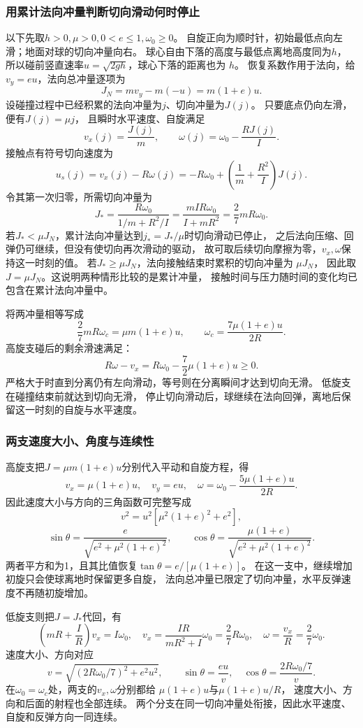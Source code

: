 \documentclass[UTF8,fontset=fandol,a4paper,11pt]{ctexart}
\begin{document}
\subsubsection*{用累计法向冲量判断切向滑动何时停止}
以下先取$h>0,\mu>0,0<e\leq1,\omega_0\geq0$。
自旋正向为顺时针，初始最低点向左滑；地面对球的切向冲量向右。
球心自由下落的高度与最低点离地高度同为$h$，
所以碰前竖直速率$u=\sqrt{2gh}$，球心下落的距离也为 $h$。
恢复系数作用于法向，给$v_y=eu$，法向总冲量逐项为
\[
J_N=mv_y-m(-u)=m(1+e)u.
\]
设碰撞过程中已经积累的法向冲量为$j$、切向冲量为$J(j)$。
只要底点仍向左滑，便有$J(j)=\mu j$，
且瞬时水平速度、自旋满足
\[
v_x(j)=\frac{J(j)}m,
\qquad \omega(j)=\omega_0-\frac{R J(j)}I.
\]
接触点有符号切向速度为
\[
u_s(j)=v_x(j)-R\omega(j)
=-R\omega_0+\left(\frac1m+\frac{R^2}{I}\right)J(j).
\]
令其第一次归零，所需切向冲量为
\[
J_* =\frac{R\omega_0}{1/m+R^2/I}
=\frac{mIR\omega_0}{I+mR^2}=\frac27mR\omega_0.
\]
若$J_*<\mu J_N$，累计法向冲量达到$j_*=J_*/\mu$时切向滑动已停止，
之后法向压缩、回弹仍可继续，但没有使切向再次滑动的驱动，
故可取后续切向摩擦为零，$v_x,\omega$保持这一时刻的值。
若$J_*\geq\mu J_N$，法向接触结束时累积的切向冲量为 $\mu J_N$，
因此取$J=\mu J_N$。这说明两种情形比较的是累计冲量，
接触时间与压力随时间的变化均已包含在累计法向冲量中。

将两冲量相等写成
\[
\frac27mR\omega_c=\mu m(1+e)u,
\qquad \omega_c=\frac{7\mu(1+e)u}{2R}.
\]
高旋支碰后的剩余滑速满足：
\[
R\omega-v_x=R\omega_0-\frac72\mu(1+e)u\geq0.
\]
严格大于时直到分离仍有左向滑动，等号则在分离瞬间才达到切向无滑。
低旋支在碰撞结束前就达到切向无滑，
停止切向滑动后，球继续在法向回弹，离地后保留这一时刻的自旋与水平速度。

\subsubsection*{两支速度大小、角度与连续性}
高旋支把$J=\mu m(1+e)u$分别代入平动和自旋方程，得
\[
v_x=\mu(1+e)u,\quad v_y=eu,\quad
\omega=\omega_0-\frac{5\mu(1+e)u}{2R}.
\]
因此速度大小与方向的三角函数可完整写成
\[
v^2=u^2[\mu^2(1+e)^2+e^2],
\]
\[
\sin\theta=\frac{e}{\sqrt{e^2+\mu^2(1+e)^2}},\qquad
\cos\theta=\frac{\mu(1+e)}{\sqrt{e^2+\mu^2(1+e)^2}}.
\]
两者平方和为1，且其比值恢复$\tan\theta=e/[\mu(1+e)]$。
在这一支中，继续增加初旋只会使球离地时保留更多自旋，
法向总冲量已限定了切向冲量，水平反弹速度不再随初旋增加。

低旋支则把$J=J_*$代回，有
\[
\left(mR+\frac IR\right)v_x=I\omega_0,
\quad v_x=\frac{IR}{mR^2+I}\omega_0=\frac27R\omega_0,
\quad \omega=\frac{v_x}{R}=\frac27\omega_0.
\]
速度大小、方向对应
\[
v=\sqrt{(2R\omega_0/7)^2+e^2u^2},
\qquad
\sin\theta=\frac{eu}{v},\quad
\cos\theta=\frac{2R\omega_0/7}{v}.
\]
在$\omega_0=\omega_c$处，两支的$v_x,\omega$分别都给
$\mu(1+e)u$与$\mu(1+e)u/R$，
速度大小、方向和后面的射程也全部连续。
两个分支在同一切向冲量处衔接，因此水平速度、自旋和反弹方向一同连续。
\end{document}
